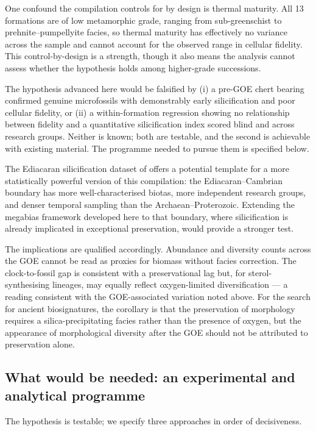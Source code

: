 \documentclass[11pt]{article}
\begin{document}
One confound the compilation controls for by design is thermal maturity. All 13 formations are of
low metamorphic grade, ranging from sub-greenschist to prehnite--pumpellyite facies, so thermal
maturity has effectively no variance across the sample and cannot account for the observed range in
cellular fidelity. This control-by-design is a strength, though it also means the analysis cannot
assess whether the hypothesis holds among higher-grade successions.

The hypothesis advanced here would be falsified by (i) a pre-GOE chert bearing confirmed genuine
microfossils with demonstrably early silicification and poor cellular fidelity, or (ii) a
within-formation regression showing no relationship between fidelity and a quantitative
silicification index scored blind and across research groups. Neither is known; both are testable,
and the second is achievable with existing material. The programme needed to pursue them is
specified below.

The Ediacaran silicification dataset of \citet{Tarhan2016} offers a potential template for a more
statistically powerful version of this compilation: the Ediacaran--Cambrian boundary has more
well-characterised biotas, more independent research groups, and denser temporal sampling than the
Archaean--Proterozoic. Extending the megabias framework developed here to that boundary, where
silicification is already implicated in exceptional preservation, would provide a stronger test.

The implications are qualified accordingly. Abundance and diversity counts across the GOE cannot be
read as proxies for biomass without facies correction. The clock-to-fossil gap is consistent with a
preservational lag but, for sterol-synthesising lineages, may equally reflect oxygen-limited
diversification --- a reading consistent with the GOE-associated variation noted above. For the
search for ancient biosignatures, the corollary is
that the preservation of morphology requires a silica-precipitating facies rather than the presence
of oxygen, but the appearance of morphological diversity after the GOE should not be attributed to
preservation alone.

\subsection{What would be needed: an experimental and analytical programme}

The hypothesis is testable; we specify three approaches in order of decisiveness.
\end{document}
